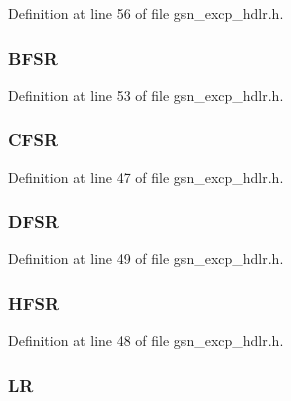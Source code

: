 Definition at line 56 of file gsn\_\-excp\_\-hdlr.h.

\hypertarget{a00070_ab724270db66160e3624be5804eb0a6be}{
\subsubsection[{BFSR}]{ {\bf BFSR}}}
\label{a00070_ab724270db66160e3624be5804eb0a6be}


Definition at line 53 of file gsn\_\-excp\_\-hdlr.h.

\hypertarget{a00070_a219283299e0eb2860edb9fceef157f6c}{
\subsubsection[{CFSR}]{ {\bf CFSR}}}
\label{a00070_a219283299e0eb2860edb9fceef157f6c}


Definition at line 47 of file gsn\_\-excp\_\-hdlr.h.

\hypertarget{a00070_a4537dafbf2cdc274f2b9521364cab961}{
\subsubsection[{DFSR}]{ {\bf DFSR}}}
\label{a00070_a4537dafbf2cdc274f2b9521364cab961}


Definition at line 49 of file gsn\_\-excp\_\-hdlr.h.

\hypertarget{a00070_a4682ccbb4f1337974d76f73d65a15e73}{
\subsubsection[{HFSR}]{ {\bf HFSR}}}
\label{a00070_a4682ccbb4f1337974d76f73d65a15e73}


Definition at line 48 of file gsn\_\-excp\_\-hdlr.h.

\hypertarget{a00070_af6054d5808462912febc35dda40a88f6}{
\subsubsection[{LR}]{ {\bf LR}}}
\label{a00070_af6054d5808462912febc35dda40a88f6}


